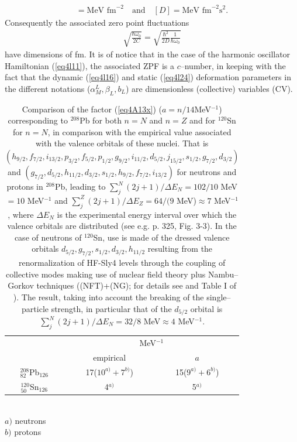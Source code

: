 \begin{align*}
[C]=\text{MeV fm}^{-2}\quad\text{and}\quad [D]=\text{MeV fm}^{-2}\text{s}^2.
\end{align*}
Consequently the associated zero point fluctuations
\begin{align}\label{eq4A18}
\sqrt{\frac{\hbar\omega_0}{2C}}=\sqrt{\frac{\hbar^2}{2D}\frac{1}{\hbar\omega_0}}
\end{align}
have dimensions of fm. It is of notice that in the case of the harmonic oscillator Hamiltonian (\ref{eq4l11}), the associated ZPF is a $c$--number, in keeping with the fact that the dynamic (\ref{eq4l16}) and static (\ref{eq4l24}) deformation parameters in the different notations ($\alpha^L_M,\beta_L,b_L$) are  dimensionless (collective) variables (CV). 
    \begin{table}
    \centering
    \begin{tabular}{|c|c|c|}
\hline
&\multicolumn{2}{c|}{MeV$^{-1}$}\\
\cline{2-3}
&empirical& $a$\\
\hline
$^{208}_{82}$Pb$_{126}$& 17($10^{a)}+7^{b)}$)& 15($9^{a)}+6^{b)}$)\\
\hline
$^{120}_{50}$Sn$_{126}$& 4$^{a)}$& 5$^{a)}$\\
\hline
    \end{tabular}\\$a)$ neutrons\\$b)$ protons\\\caption{
    Comparison of the factor (\ref{eq4A13x}) ($a=n/14$MeV$^{-1}$) corresponding to $^{208}$Pb for both $n=N$ and $n=Z$ and for $^{120}$Sn for $n=N$, in comparison with the empirical value associated with the valence orbitals of these nuclei. That is $(h_{9/2},f_{7/2},i_{13/2},p_{3/2},f_{5/2},p_{1/2},g_{9/2},i_{11/2},d_{5/2},j_{15/2},s_{1/2},g_{7/2},d_{3/2})$ and $(g_{7/2},d_{5/2},h_{11/2},d_{3/2},s_{1/2},h_{9/2},f_{7/2},i_{13/2})$ for neutrons and protons in $^{208}$Pb, leading to $\sum_j^N(2j+1)/\Delta E_N=102/10$ MeV$=10$ MeV$^{-1}$ and $\sum_j^Z(2j+1)/\Delta E_Z=64/(9$ MeV)$\approx7$ MeV$^{-1}$, where $\Delta E_N$ is the experimental energy interval over which the valence orbitals are distributed (see e.g. \cite{Bohr:69} p. 325, Fig. 3-3). In the case of neutrons of $^{120}$Sn, use is made of the dressed valence orbitals $d_{5/2},g_{7/2},s_{1/2},d_{3/2},h_{11/2}$ resulting from the renormalization of HF-Sly4 levels through the coupling of collective modes making use of nuclear field theory plus Nambu--Gorkov techniques ((NFT)+(NG); for details see \cite{Idini:15} and Table I of \cite{Potel:17}). The result, taking into account the breaking of the single--particle strength, in particular that of the $d_{5/2}$ orbital is $\sum_j^N(2j+1)/\Delta E_N=32/8$ MeV$\approx4$ MeV$^{-1}$.}\label{tab4A1}
    \end{table}
